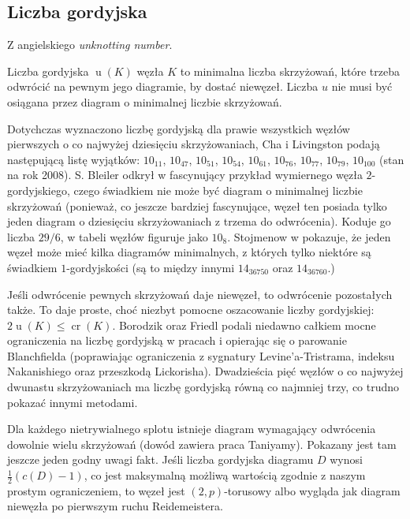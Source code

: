 
\subsection{Liczba gordyjska} %
\label{sub:unknotting_number}
Z angielskiego \emph{unknotting number}.

\begin{definition}
    Liczba gordyjska $\operatorname{u}(K)$ węzła $K$ to minimalna liczba skrzyżowań,
    które trzeba odwrócić na pewnym jego diagramie, by dostać niewęzeł.
    Liczba $u$ nie musi być osiągana przez diagram o minimalnej liczbie skrzyżowań.
\end{definition}

Dotychczas wyznaczono liczbę gordyjską dla prawie wszystkich węzłów pierwszych o co najwyżej dziesięciu skrzyżowaniach,
Cha i Livingston podają następującą listę wyjątków:
$10_{11}$, $10_{47}$, $10_{51}$, $10_{54}$, $10_{61}$, $10_{76}$, $10_{77}$, $10_{79}$, $10_{100}$ (stan na rok 2008).
S. Bleiler odkrył w \cite{bleiler84} fascynujący przykład wymiernego węzła $2$-gordyjskiego,
czego świadkiem nie może być diagram o minimalnej liczbie skrzyżowań
(ponieważ, co jeszcze bardziej fascynujące, węzeł ten posiada tylko jeden diagram o dziesięciu skrzyżowaniach z trzema do odwrócenia).
Koduje go liczba $29/6$, w tabeli węzłów figuruje jako $10_8$.
Stojmenow w \cite{stoimenow01} pokazuje, że jeden węzeł może mieć kilka diagramów minimalnych,
z których tylko niektóre są świadkiem $1$-gordyjskości (są to między innymi $14_{36750}$ oraz $14_{36760}$.)

Jeśli odwrócenie pewnych skrzyżowań daje niewęzeł, to odwrócenie pozostałych także.
To daje proste, choć niezbyt pomocne oszacowanie liczby gordyjskiej: $2 \operatorname{u} (K) \le \operatorname{cr} (K)$.
Borodzik oraz Friedl podali niedawno całkiem mocne ograniczenia na liczbę gordyjską w pracach \cite{borodzik14} i \cite{borodzik15} opierając się o parowanie Blanchfielda
(poprawiając ograniczenia z sygnatury Levine'a-Tristrama, indeksu Nakanishiego oraz przeszkodą Lickorisha).
Dwadzieścia pięć węzłów o co najwyżej dwunastu skrzyżowaniach ma liczbę gordyjską równą co najmniej trzy, co trudno pokazać innymi metodami.

Dla każdego nietrywialnego splotu istnieje diagram wymagający odwrócenia dowolnie wielu skrzyżowań (dowód zawiera praca \cite{taniyama09} Taniyamy).
Pokazany jest tam jeszcze jeden godny uwagi fakt.
Jeśli liczba gordyjska diagramu $D$ wynosi $\frac 12 (c(D) - 1)$,
co jest maksymalną możliwą wartością zgodnie z naszym prostym ograniczeniem,
to węzeł jest $(2,p)$-torusowy albo wygląda jak diagram niewęzła po pierwszym ruchu Reidemeistera.

